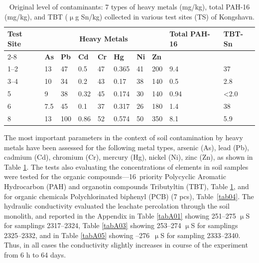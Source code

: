\documentclass[algorithms,article,accept,pdftex,moreauthors]{Definitions/mdpi}
\begin{document}
\begin{table}[H] 
\setcellgapes{1pt}
\makegapedcells
\caption{Original level of contaminants: 7 types of heavy metals (mg/kg), total PAH-16 (mg/kg), and TBT ($\upmu$g Sn/kg) collected in various test sites (TS) of Kongshavn.\label{tab03}}
\begin{tabularx}{\textwidth}{p{1.2cm} p{0.8cm} p{0.8cm} p{0.8cm}p{0.6cm}p{0.8cm}p{0.8cm}p{0.8cm}p{2.0cm}p{1.1cm}}
\toprule
\multirow{2.7}{*}{\textbf{Test Site}} & \multicolumn{7}{c}{\textbf{Heavy Metals}} & \multirow{2.7}{*}{\textbf{Total PAH-16}} & \multirow{2.7}{*}{\textbf{TBT-Sn}}\\ \cmidrule{2-8}
& \textbf{As} & \textbf{Pb} & \textbf{Cd} & \textbf{Cr} & \textbf{Hg} & \textbf{Ni} & \textbf{Zn} & & \\
\midrule
	1--2 	& 13	& 47 & 0{.}5 & 47 & 0{.}365 & 41 & 200 & 9{.}4 & 37 \\
	3--4 & 10	& 34 & 0{.}2 & 43 & 0{.}17 & 38 & 140 & 0{.}5 & 2{.}8 \\
	5 &    9	& 38 & 0{.}32 & 45 & 0{.}174 & 30 & 140 & 0{.}94 & <2.0 \\
	6 &   7{.}5	& 45 & 0{.}1 & 37 & 0{.}317 & 26 & 180 & 1{.}4 & 38 \\
	8 &   13	& 100 & 0{.}86 & 52 & 0{.}574 & 50 & 350 & 8{.}1 & 5{.}9 \\
\bottomrule
\end{tabularx}
\end{table}

{The} most important parameters in the context of soil contamination by heavy metals have been assessed for the following metal types, arsenic (As), lead (Pb), cadmium (Cd), chromium (Cr), mercury (Hg), nickel (Ni), zinc (Zn), as shown in Table \ref{tab03}. The tests also evaluating the concentrations of elements in soil samples were tested for the organic compounds---16~priority Polycyclic Aromatic Hydrocarbon (PAH) and organotin compounds Tributyltin (TBT), Table \ref{tab03}, and for organic chemicals Polychlorinated biphenyl (PCB) (7 pcs), \mbox{Table \ref{tab04}}. {The hydraulic conductivity evaluated the leachate percolation through the soil monolith, and reported in the Appendix in Table} \ref{tabA01} {showing 251--275 $\upmu$S for samplings 2317--2324, Table} \ref{tabA03} {showing 253--274 $\upmu$S for samplings 2325--2332, and in Table} \ref{tabA05} {showing --276~$\upmu$S for sampling 2333--2340. Thus, in all cases the conductivity slightly increases in course of the experiment from 6 h to 64 days.}
\end{document}
